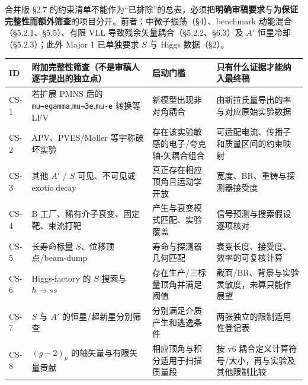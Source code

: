\documentclass[
  chinese,
  UTF8]{ctexart}
\newcounter{none} %
\begin{document}
合并版 §2.7
的约束清单不能作为``已排除''的总表，必须把\textbf{明确审稿要求}与\textbf{为保证完整性而额外筛查}的项目分开。前者：中微子振荡（§4）、benchmark
动能混合（§5.2.1、§5.5）、有限 VLL 导致残余矢量耦合（§5.2.2、§6.3）及
\(A'\) 恒星冷却（§5.2.3）；此外 Major 1 已单独要求 \(S\) 与 Higgs
数据（§2）。

{\def\LTcaptype{none} %
\begin{longtable}[]{@{}
  >{\raggedright\arraybackslash}p{}
  >{\raggedright\arraybackslash}p{}
  >{\raggedright\arraybackslash}p{}
  >{\raggedright\arraybackslash}p{}@{}}
\toprule\noalign{}
\begin{minipage}[b]{\linewidth}\raggedright
ID
\end{minipage} & \begin{minipage}[b]{\linewidth}\raggedright
附加完整性筛查（不是审稿人逐字提出的独立点）
\end{minipage} & \begin{minipage}[b]{\linewidth}\raggedright
启动门槛
\end{minipage} & \begin{minipage}[b]{\linewidth}\raggedright
只有什么证据才能纳入最终稿
\end{minipage} \\
\midrule\noalign{}
\endhead
\bottomrule\noalign{}
\endlastfoot
CS-1 & 若扩展 PMNS 后的 \texttt{mu→egamma},\texttt{mu→3e},\texttt{mu-e}
转换等 LFV & 新模型出现非对角耦合 &
由新拉氏量导出的率与对应原始实验数据 \\
CS-2 & APV、PVES/Møller 等宇称破坏实验 &
存在该实验敏感的电子/夸克轴-矢耦合组合 &
可适配电流、传播子和质量区间的约束映射 \\
CS-3 & 其他 \(A'\) / \(S\) 可见、不可见或 exotic decay &
真正存在相应顶角且运动学开放 & 宽度、BR、重铸与探测器接受度 \\
CS-4 & B 工厂、稀有介子衰变、固定靶、束流打靶 &
产生与衰变模式匹配、实验覆盖 & 信号预测与搜索假设逐项核对 \\
CS-5 & 长寿命标量 \(S\)、位移顶点/beam-dump & 寿命与探测器几何匹配 &
衰变长度、接受度、效率的可复核计算 \\
CS-6 & Higgs-factory 的 \(S\) 搜索与 \(h\to ss\) &
存在生产/三标量顶角并满足阈值 &
截面/BR、背景与实验灵敏度，未算只能作展望 \\
CS-7 & \(S\) 与 \(A'\) 的恒星/超新星分别筛查 &
分别满足介质产生和逃逸条件 & 两张独立的限制适用性登记表 \\
CS-8 & \((g-2)_\mu\) 的轴矢量与有限矢量贡献 &
相应顶角与积分适用于扫描质量段 & 按 v6
耦合定义计算符号/大小，再与实验及其他限制比较 \\
\end{longtable}
}
\end{document}

